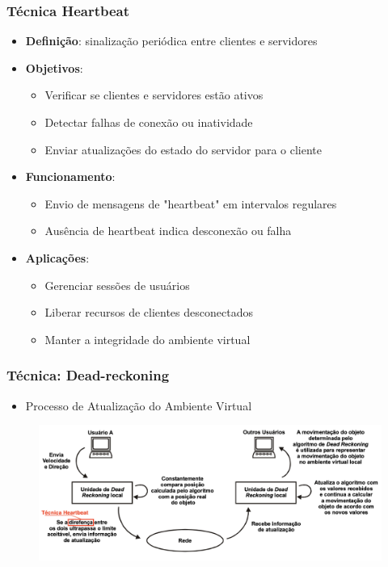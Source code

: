 \documentclass{beamer}
\begin{document}
\begin{frame}
  \frametitle{Técnica Heartbeat}
  \begin{itemize}
    \item \textbf{Definição}: sinalização periódica entre clientes e servidores
    \item \textbf{Objetivos}:
    \begin{itemize}
      \item Verificar se clientes e servidores estão ativos
      \item Detectar falhas de conexão ou inatividade
      \item Enviar atualizações do estado do servidor para o cliente
    \end{itemize}
    \item \textbf{Funcionamento}:
    \begin{itemize}
      \item Envio de mensagens de "heartbeat" em intervalos regulares
      \item Ausência de heartbeat indica desconexão ou falha
    \end{itemize}
    \item \textbf{Aplicações}:
    \begin{itemize}
      \item Gerenciar sessões de usuários
      \item Liberar recursos de clientes desconectados
      \item Manter a integridade do ambiente virtual
    \end{itemize}
  \end{itemize}
  \begin{flushright}
    \scriptsize
    \cite{Eduardo2002}
  \end{flushright}
\end{frame}

\begin{frame}
  \frametitle{Técnica: Dead-reckoning}
  \begin{itemize}
    \item Processo de Atualização do Ambiente Virtual
  \end{itemize}
  \begin{figure}[h]
    \centering
    \vspace{-18pt}
    \includegraphics[width=1.03\textwidth]{imagem_Deadreckoning.png}
    \vspace{-20pt}
  \end{figure}
  \begin{flushright}
    \scriptsize
    \cite{Eduardo2002}
  \end{flushright}
\end{frame}
\end{document}
